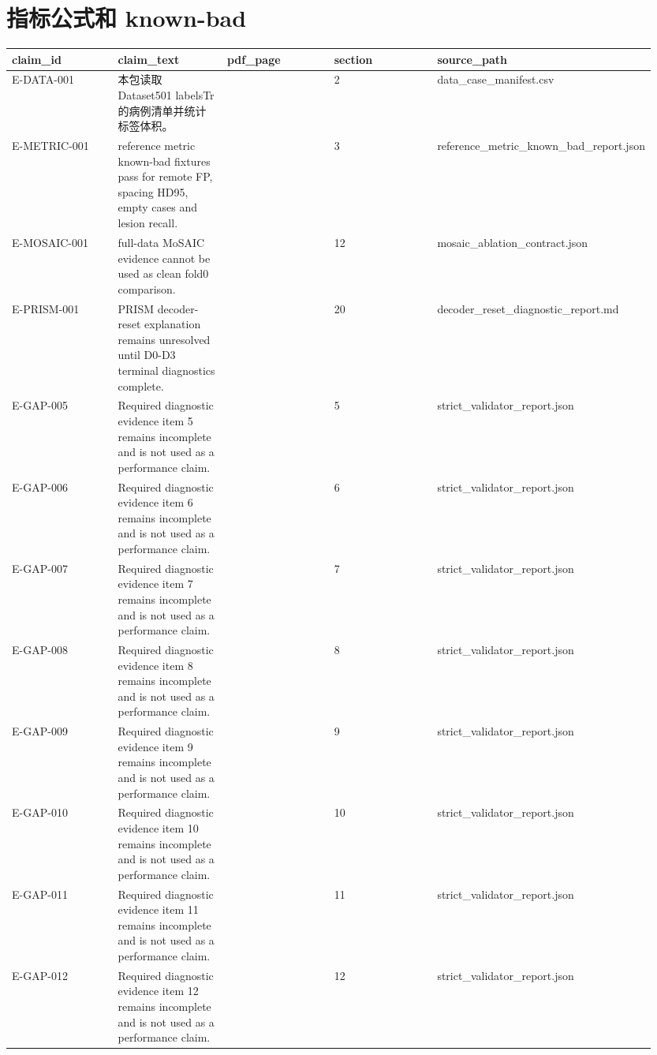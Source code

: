 \section{指标公式和 known-bad}
\begin{longtable}{p{0.19\linewidth}p{0.19\linewidth}p{0.19\linewidth}p{0.19\linewidth}p{0.19\linewidth}}
\toprule
claim\_id & claim\_text & pdf\_page & section & source\_path\\
\midrule
E-DATA-001 & 本包读取 Dataset501 labelsTr 的病例清单并统计标签体积。 &  & 2 & data\_case\_manifest.csv\\
E-METRIC-001 & reference metric known-bad fixtures pass for remote FP, spacing HD95, empty cases and lesion recall. &  & 3 & reference\_metric\_known\_bad\_report.json\\
E-MOSAIC-001 & full-data MoSAIC evidence cannot be used as clean fold0 comparison. &  & 12 & mosaic\_ablation\_contract.json\\
E-PRISM-001 & PRISM decoder-reset explanation remains unresolved until D0-D3 terminal diagnostics complete. &  & 20 & decoder\_reset\_diagnostic\_report.md\\
E-GAP-005 & Required diagnostic evidence item 5 remains incomplete and is not used as a performance claim. &  & 5 & strict\_validator\_report.json\\
E-GAP-006 & Required diagnostic evidence item 6 remains incomplete and is not used as a performance claim. &  & 6 & strict\_validator\_report.json\\
E-GAP-007 & Required diagnostic evidence item 7 remains incomplete and is not used as a performance claim. &  & 7 & strict\_validator\_report.json\\
E-GAP-008 & Required diagnostic evidence item 8 remains incomplete and is not used as a performance claim. &  & 8 & strict\_validator\_report.json\\
E-GAP-009 & Required diagnostic evidence item 9 remains incomplete and is not used as a performance claim. &  & 9 & strict\_validator\_report.json\\
E-GAP-010 & Required diagnostic evidence item 10 remains incomplete and is not used as a performance claim. &  & 10 & strict\_validator\_report.json\\
E-GAP-011 & Required diagnostic evidence item 11 remains incomplete and is not used as a performance claim. &  & 11 & strict\_validator\_report.json\\
E-GAP-012 & Required diagnostic evidence item 12 remains incomplete and is not used as a performance claim. &  & 12 & strict\_validator\_report.json\\

\end{longtable}
